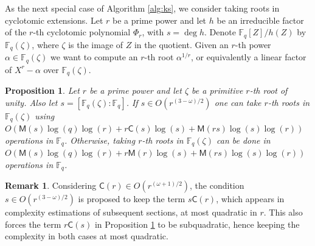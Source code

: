 \documentclass[12pt]{article}
\theoremstyle{plain}
\newtheorem{proposition}[theorem]{Proposition}
\theoremstyle{definition}
\newtheorem*{remark}{Remark}
\def\F{\ensuremath{\mathbb{F}}}
\def\MM{\ensuremath{\mathsf{M}}}
\def\CC{\ensuremath{\mathsf{C}}}
\begin{document}
As the next special case of Algorithm \ref{alg:ks}, we consider taking roots in cyclotomic
extensions. Let $r$ be a prime power and let $h$ be an irreducible factor of the $r$-th
cyclotomic polynomial $\Phi_r$, with $s = \deg h$. Denote $\F_q[Z] / h(Z)$ by $\F_q(\zeta)$, where 
$\zeta$ is the image of $Z$ in the quotient. Given an $r$-th power $\alpha \in \F_q(\zeta)$ we want 
to compute an $r$-th root $\alpha^{1 / r}$, or equivalently a linear factor of $X^r - \alpha$ over 
$\F_q(\zeta)$.
\begin{proposition}
	\label{prop:root-fpz}
	Let $r$ be a prime power and let $\zeta$ be a primitive $r$-th root of unity. Also let $s = 
	[\F_q(\zeta): \F_q]$. If $s \in O(r^{(3 - \omega) / 2})$ one can take $r$-th roots in 
	$\F_q(\zeta)$ using $O(\MM(s)\log(q)\log(r) + r\CC(s)\log(s) + \MM(rs)\log(s)\log(r))$ 
	operations in $\F_q$. Otherwise, taking $r$-th roots in $\F_q(\zeta)$ can be done in 
	$O(\MM(s)\log(q)\log(r) + r\MM(r)\log(s) + \MM(rs)\log(s)\log(r))$ operations in $\F_q$. 
\end{proposition}
\begin{remark}
	\label{terms-l-s}
	Considering $\CC(r) \in O(r^{(\omega + 1) / 2})$, the condition $s \in O(r^{(3 - \omega) / 
	2})$ is proposed to keep the term $s\CC(r)$, which appears in complexity estimations of 
	subsequent sections, at most quadratic in $r$. This also forces the term $r\CC(s)$ in 
	Proposition \ref{prop:root-fpz} to be subquadratic, hence keeping the complexity in both cases 
	at most quadratic. 
\end{remark}
\end{document}
